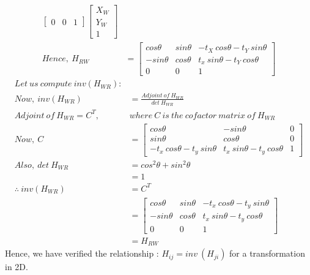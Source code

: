 \documentclass[a4paper,fleqn,11pt]{article}
\theoremstyle{mytheor}
\begin{document}
\begin{align*}
\begin{bmatrix}
	 			 0	    & 	   0	  &  				 1
		\end{bmatrix}
		\begin{bmatrix}
		  	X_W \\
		  	Y_W \\
		  	 1
		 \end   {bmatrix} \\
Hence,\ H_{RW} & = \begin{bmatrix}
	 			cos \theta & sin \theta & -t_X\ cos\theta	- t_Y\ sin\theta \\
	 			-sin \theta & cos \theta &  t_x\ sin\theta - t_Y\ cos\theta \\
	 			 	0	    & 	   0	  &  				 1
		 		    \end{bmatrix}
\end{align*}
\begin{align*}
Let\ us\ compute\ inv(H_{WR}) : \\
Now,\ inv(H_{WR}) & = \frac{Adjoint\ of\ H_{WR}}{det\ H_{WR}} \\
Adjoint\ of\ H_{WR} = C^T,\
						& where\ C\ is\ the\ cofactor\ matrix\ of\ H_{WR} \\
Now,\ C & = \begin{bmatrix}
	 cos\theta 						  & -sin\theta 						 & 0 \\
	 sin\theta 						  &  cos\theta 						 & 0 \\
 	-t_x\ cos\theta - t_y\ sin\theta & t_x\ sin\theta - t_y\ cos\theta & 1
		    \end{bmatrix} \\
Also,\ det\ H_{WR} & = cos^2\theta + sin^2\theta \\
		  		   & = 1 \\
\therefore\ inv(H_{WR}) & = C^T \\
& = \begin{bmatrix}
 	 cos\theta & sin\theta & -t_x\ cos\theta - t_y\ sin\theta \\
	-sin\theta & cos\theta &  t_x\ sin\theta - t_y\ cos\theta \\
		0	   &	0		&				  1			
\end{bmatrix} \\
& = H_{RW}
\end{align*}
Hence, we have verified the relationship : $H_{ij} = inv\ (H_{ji})$ for a transformation in 2D.
\end{document}
